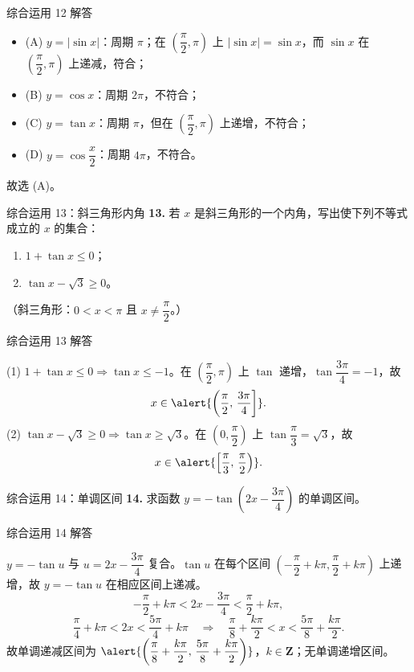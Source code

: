 \documentclass[10pt,aspectratio=169,serif]{beamer}
\begin{document}
\begin{frame}[t]{综合运用 12 解答}
\begin{tcolorbox}[colback=orange!10,colframe=orange,title=\textbf{解}]
\begin{itemize}
  \item (A) $y=|\sin x|$：周期 $\pi$；在 $\left(\dfrac\pi2,\pi\right)$ 上 $|\sin x|=\sin x$，而 $\sin x$ 在 $\left(\dfrac\pi2,\pi\right)$ 上递减，符合；
  \item (B) $y=\cos x$：周期 $2\pi$，不符合；
  \item (C) $y=\tan x$：周期 $\pi$，但在 $\left(\dfrac\pi2,\pi\right)$ 上递增，不符合；
  \item (D) $y=\cos\dfrac{x}{2}$：周期 $4\pi$，不符合。
\end{itemize}
故选 \alert{(A)}。
\end{tcolorbox}
\end{frame}

\begin{frame}[t]{综合运用 13：斜三角形内角}
\textbf{13.} 若 $x$ 是斜三角形的一个内角，写出使下列不等式成立的 $x$ 的集合：
\begin{enumerate}[(1)]
  \item $1+\tan x\le0$； \qquad
  \item $\tan x-\sqrt3\ge0$。
\end{enumerate}
\small（斜三角形：$0<x<\pi$ 且 $x\ne\dfrac\pi2$。）
\end{frame}

\begin{frame}[t]{综合运用 13 解答}
\begin{tcolorbox}[colback=orange!10,colframe=orange,title=\textbf{解}]
(1) $1+\tan x\le0\Rightarrow\tan x\le-1$。在 $\left(\dfrac\pi2,\pi\right)$ 上 $\tan$ 递增，$\tan\dfrac{3\pi}{4}=-1$，故
\[
x\in\alert{\left(\frac{\pi}{2},\,\frac{3\pi}{4}\right]}.
\]
(2) $\tan x-\sqrt3\ge0\Rightarrow\tan x\ge\sqrt3$。在 $\left(0,\dfrac\pi2\right)$ 上 $\tan\dfrac\pi3=\sqrt3$，故
\[
x\in\alert{\left[\frac{\pi}{3},\,\frac{\pi}{2}\right)}.
\]
\end{tcolorbox}
\end{frame}

\begin{frame}[t]{综合运用 14：单调区间}
\textbf{14.} 求函数 $y=-\tan\!\left(2x-\dfrac{3\pi}{4}\right)$ 的单调区间。
\end{frame}

\begin{frame}[t]{综合运用 14 解答}
\begin{tcolorbox}[colback=orange!10,colframe=orange,title=\textbf{解}]
$y=-\tan u$ 与 $u=2x-\dfrac{3\pi}{4}$ 复合。$\tan u$ 在每个区间 $\left(-\dfrac\pi2+k\pi,\dfrac\pi2+k\pi\right)$ 上递增，故 $y=-\tan u$ 在相应区间上\alert{递减}。
\[
-\frac{\pi}{2}+k\pi<2x-\frac{3\pi}{4}<\frac{\pi}{2}+k\pi,
\]
\[
\frac{\pi}{4}+k\pi<2x<\frac{5\pi}{4}+k\pi
\quad\Rightarrow\quad
\frac{\pi}{8}+\frac{k\pi}{2}<x<\frac{5\pi}{8}+\frac{k\pi}{2}.
\]
故单调\alert{递减}区间为 $\alert{\left(\dfrac{\pi}{8}+\dfrac{k\pi}{2},\,\dfrac{5\pi}{8}+\dfrac{k\pi}{2}\right)}$，$k\in\mathbf Z$；无单调递增区间。
\end{tcolorbox}
\end{frame}
\end{document}
